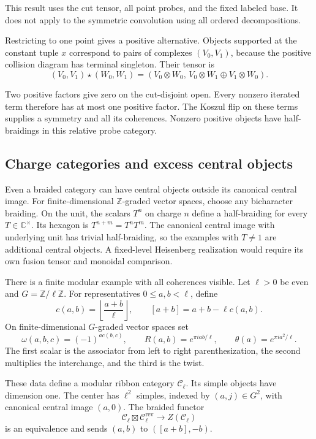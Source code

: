This result uses the cut tensor, all point probes,
and the fixed labeled base. It does not apply to the
symmetric convolution using all ordered decompositions.

Restricting to one point gives a positive alternative.
Objects supported at the constant tuple $x$ correspond
to pairs of complexes $(V_0,V_1)$, because the positive
collision diagram has terminal singleton.
Their tensor is
\[
 (V_0,V_1)\star(W_0,W_1)=
 (V_0\otimes W_0,\,
  V_0\otimes W_1\oplus V_1\otimes W_0).
\]

Two positive factors give zero on the cut-disjoint open.
Every nonzero iterated term therefore has at most one
positive factor. The Koszul flip on these terms supplies
a symmetry and all its coherences.
Nonzero positive objects have half-braidings in this
relative probe category.

\subsection{Charge categories and excess central objects}

Even a braided category can have central objects outside
its canonical central image.
For finite-dimensional $\mathbb Z$-graded vector spaces,
choose any bicharacter braiding.
On the unit, the scalars $T^n$ on charge $n$ define
a half-braiding for every $T\in\mathbb C^\times$.
Its hexagon is $T^{n+m}=T^nT^m$.
The canonical central image with underlying unit has
trivial half-braiding, so the examples with $T\ne1$
are additional central objects.
A fixed-level Heisenberg realization would require its
own fusion tensor and monoidal comparison.

There is a finite modular example with all coherences visible.
Let $\ell>0$ be even and $G=\mathbb Z/\ell\mathbb Z$.
For representatives $0\leq a,b<\ell$, define
\[
 c(a,b)=\left\lfloor\frac{a+b}{\ell}\right\rfloor,\qquad
 [a+b]=a+b-\ell c(a,b).
\]
On finite-dimensional $G$-graded vector spaces set
\[
 \omega(a,b,c)=(-1)^{a c(b,c)},\qquad
 R(a,b)=e^{\pi iab/\ell},\qquad
 \theta(a)=e^{\pi ia^2/\ell}.
\]
The first scalar is the associator from left to right
parenthesization, the second multiplies the interchange,
and the third is the twist.

\begin{proposition}
\label{v4-arith:centers:prop:cyclic-center}
These data define a modular ribbon category $\mathcal C_\ell$.
Its simple objects have dimension one.
The center has $\ell^2$ simples, indexed by $(a,j)\in G^2$,
with canonical central image $(a,0)$.
The braided functor
\[
 \mathcal C_\ell\boxtimes\mathcal C_\ell^{\mathrm{rev}}
 \longrightarrow Z(\mathcal C_\ell)
\]
is an equivalence and sends $(a,b)$ to $([a+b],-b)$.
\end{proposition}

